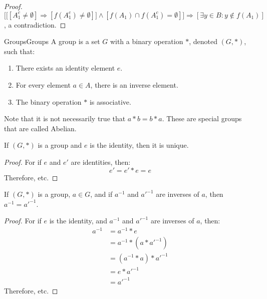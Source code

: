         \begin{proof}
        $\Big[\big[[A_1^c \ne \emptyset]\Rightarrow [f(A_1^c) \ne \emptyset]\big]\land[f(A_1)\cap f(A_1^c) = \emptyset]\Big]\Rightarrow [\exists y\in B:y\notin f(A_1)]$, a contradiction.
        \end{proof}
        \begin{fdefinition}{Groups}{Groups}
            A group is a set $G$ with a binary operation $*$,
            denoted $(G,*)$, such that: 
            \begin{enumerate}
                \item There exists an identity element $e$.
                \item For every element $a\in{A}$, there is an inverse element.
                \item The binary operation $*$ is associative.
            \end{enumerate}
        \end{fdefinition}
        Note that it is not necessarily true that $a*b = b*a$.
        These are special groups that are called Abelian.
        \begin{theorem}
            If $(G,*)$ is a group and $e$ is the identity, then it is unique.
        \end{theorem}
        \begin{proof}
            For if $e$ and $e'$ are identities, then:
            \begin{equation}
                e'=e'*e=e
            \end{equation}
            Therefore, etc.
        \end{proof}
        \begin{theorem}
            \label{thm:Group_Theory_Inverses_Are_Unique}
            If $(G,*)$ is a group, $a\in{G}$, and if $a^{-1}$ and
            $a'^{-1}$ are inverses of $a$, then $a^{-1}=a'^{-1}$.
        \end{theorem}
        \begin{proof}
            For if $e$ is the identity, and
            $a^{-1}$ and $a'^{-1}$ are inverses of $a$, then:
            \begin{align}
                a^{-1}&=a^{-1}*e
                \tag{Identitive Property}\\
                &=a^{-1}*(a*a'^{-1})
                \tag{Inverse Property}\\
                &=(a^{-1}*a)*a'^{-1}
                \tag{Associative Property}\\
                &=e*a'^{-1}
                \tag{Inverse Property}\\
                &=a'^{-1}
                \tag{Identitive Property}
            \end{align}
            Therefore, etc.
        \end{proof}
